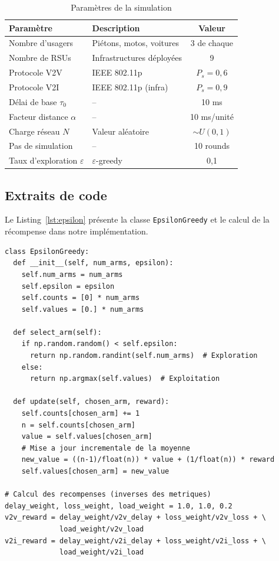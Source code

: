 \documentclass[12pt,a4paper]{article}
\begin{document}
\begin{table}[H]
\centering
\caption{Paramètres de la simulation}
\label{tab:params}
\begin{tabular}{@{}llc@{}}
\toprule
\textbf{Paramètre} & \textbf{Description} & \textbf{Valeur} \\
\midrule
Nombre d'usagers   & Piétons, motos, voitures & 3 de chaque \\
Nombre de RSUs     & Infrastructures déployées & 9 \\
Protocole V2V      & IEEE 802.11p & $P_s = 0{,}6$ \\
Protocole V2I      & IEEE 802.11p (infra) & $P_s = 0{,}9$ \\
Délai de base $\tau_0$ & -- & 10 ms \\
Facteur distance $\alpha$ & -- & 10 ms/unité \\
Charge réseau $N$ & Valeur aléatoire & $\sim U(0,1)$ \\
Pas de simulation  & -- & 10 rounds \\
Taux d'exploration $\varepsilon$ & $\varepsilon$-greedy & 0{,}1 \\
\bottomrule
\end{tabular}
\end{table}

\subsection{Extraits de code}

Le Listing~\ref{lst:epsilon} présente la classe \texttt{EpsilonGreedy} et le
calcul de la récompense dans notre implémentation.

\begin{lstlisting}[caption={Implémentation de l'algorithme $\varepsilon$-greedy},
                   label={lst:epsilon}]
class EpsilonGreedy:
  def __init__(self, num_arms, epsilon):
    self.num_arms = num_arms
    self.epsilon = epsilon
    self.counts = [0] * num_arms
    self.values = [0.] * num_arms

  def select_arm(self):
    if np.random.random() < self.epsilon:
      return np.random.randint(self.num_arms)  # Exploration
    else:
      return np.argmax(self.values)  # Exploitation

  def update(self, chosen_arm, reward):
    self.counts[chosen_arm] += 1
    n = self.counts[chosen_arm]
    value = self.values[chosen_arm]
    # Mise a jour incrementale de la moyenne
    new_value = ((n-1)/float(n)) * value + (1/float(n)) * reward
    self.values[chosen_arm] = new_value

# Calcul des recompenses (inverses des metriques)
delay_weight, loss_weight, load_weight = 1.0, 1.0, 0.2
v2v_reward = delay_weight/v2v_delay + loss_weight/v2v_loss + \
             load_weight/v2v_load
v2i_reward = delay_weight/v2i_delay + loss_weight/v2i_loss + \
             load_weight/v2i_load
\end{lstlisting}
\end{document}
